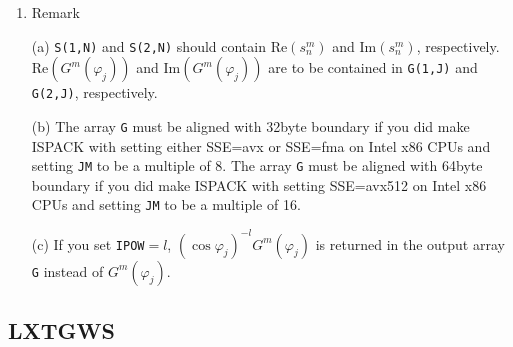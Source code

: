 \documentclass[a4paper]{scrartcl}
\begin{document}
\begin{enumerate}
\item Remark

(a) \texttt{S(1,N)} and \texttt{S(2,N)} should 
contain $\mbox{Re}(s^m_n)$ and $\mbox{Im}(s^m_n)$, respectively.
$\mbox{Re}(G^m(\varphi_j))$ and 
$\mbox{Im}(G^m(\varphi_j))$ 
are to be contained in \texttt{G(1,J)} and \texttt{G(2,J)}, respectively.
  
(b) The array \texttt{G} must be aligned with 32byte boundary
if you did make ISPACK with setting either SSE=avx or SSE=fma
on Intel x86 CPUs and setting \texttt{JM} to be a multiple of 8.
The array \texttt{G} must be aligned with 64byte boundary
if you did make ISPACK with setting SSE=avx512
on Intel x86 CPUs and setting \texttt{JM} to be a multiple of 16.

(c) If you set \texttt{IPOW}$=l$, 
$(\cos\varphi_j)^{-l}G^m(\varphi_j)$ is returned 
in the output array \texttt{G} instead of $G^m(\varphi_j)$.

\end{enumerate}



\subsection{LXTGWS}
\end{document}

